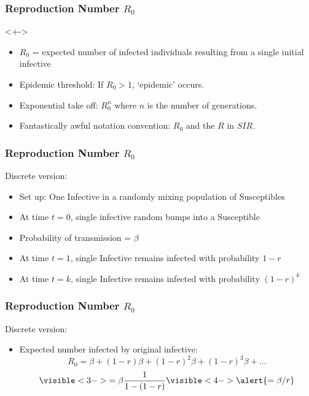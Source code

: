 \begin{frame}
  \frametitle{Reproduction Number $R_0$}

  \begin{block}<+->{}
  \begin{itemize}
  \item<+-> 
    $R_0$ = expected number of infected individuals resulting
    from a single initial infective
  \item<+-> 
    Epidemic threshold: If $R_0 > 1$, `epidemic' occurs.
  \item<+-> 
    Exponential take off: $R_0^{n}$ where $n$ is the number
    of generations.
  \item<+-> 
    Fantastically awful notation convention: $R_0$ and the $R$ in $SIR$.
  \end{itemize}
  \end{block}

\end{frame}


\begin{frame}
  \frametitle{Reproduction Number $R_0$}

  \begin{block}{Discrete version:}
    \begin{itemize}
    \item<1-> Set up: One Infective in a randomly mixing population of Susceptibles
    \item<2-> At time $t=0$, single infective random bumps into a Susceptible
    \item<3-> Probability of transmission = $\beta$
    \item<4-> At time $t=1$, single Infective remains infected with probability $1-r$
    \item<5-> At time $t=k$, single Infective remains infected with probability $(1-r)^k$
    \end{itemize}
  \end{block}    

\end{frame}


\begin{frame}
  \frametitle{Reproduction Number $R_0$}

  \begin{block}{Discrete version:}
    \begin{itemize}
    \item<1-> Expected number infected by original infective:
      $$
      R_0 = \beta + (1-r)\beta + (1-r)^2\beta + (1-r)^3\beta + \ldots
      $$
      $$
      \visible<3->{= \beta \frac{1}{1 - (1-r)}}
      \visible<4->{\alert{= \beta/r}}
      $$
    \end{itemize}
  \end{block}

\end{frame}


